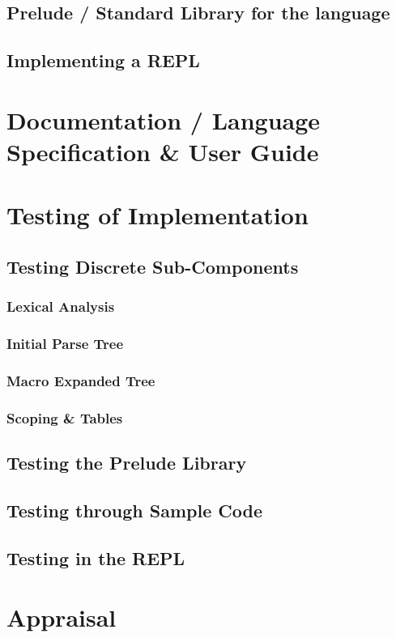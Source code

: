 \documentclass{article}
\begin{document}
  \subsection{Prelude / Standard Library for the language}
  \subsection{Implementing a REPL}

\section{Documentation / Language Specification \& User Guide}

\section{Testing of Implementation}
  \subsection{Testing Discrete Sub-Components}
    \subsubsection{Lexical Analysis}
    \subsubsection{Initial Parse Tree}
    \subsubsection{Macro Expanded Tree}
    \subsubsection{Scoping \& Tables}
  \subsection{Testing the Prelude Library}
  \subsection{Testing through Sample Code}
  \subsection{Testing in the REPL}

\section{Appraisal}
\end{document}
